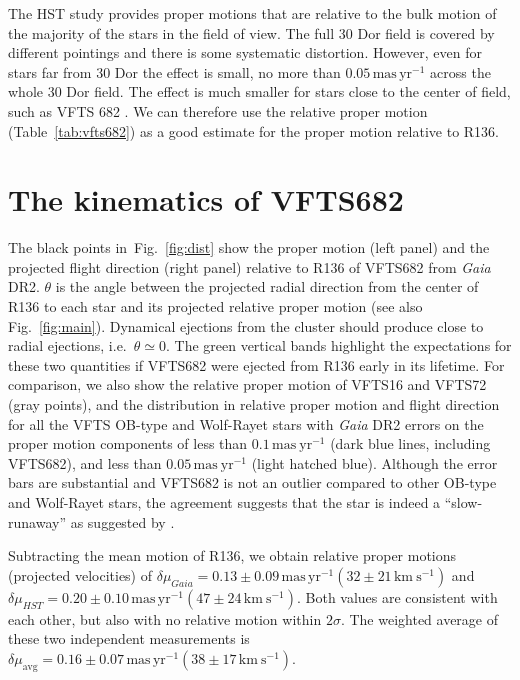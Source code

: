 \documentclass[a4paper,fleqn,usenatbib]{mnras}
\newcommand{\kms}{{\,\mathrm{km\ s^{-1}}}}
\newcommand{\masyr}{\,\mathrm{mas}\,\mathrm{yr}^{-1}}
\DeclareRobustCommand{\Figref}[1]{Fig.~\ref{#1}}
\DeclareRobustCommand{\Tabref}[1]{Table~\ref{#1}}
\begin{document}
The HST study provides proper motions that are relative to the bulk motion
of the majority of the stars in the field of view. The full 30 Dor
field is covered by different pointings and there is some systematic
distortion.  However, even for stars far from 30 Dor the effect is
small, no more than $0.05\masyr$ across the whole 30 Dor field. The
effect is much smaller for stars close to the center of field, such as
VFTS 682 \citep{platais:18}.  We can therefore use the relative proper
motion (\Tabref{tab:vfts682}) as a good estimate for the proper motion relative to R136. 
 

\section{The kinematics of VFTS682}
\label{sec:results}

The black points in~\Figref{fig:dist} show the proper motion 
(left panel) and the projected flight direction (right panel) relative
to R136 of
VFTS682 from \emph{Gaia} DR2. $\theta$ is the angle between the projected radial direction from the
center of R136 to each star and its projected relative proper motion
(see also \Figref{fig:main}). Dynamical ejections from the
cluster should %
produce close to radial ejections, i.e.~$\theta\simeq0$. The green
vertical bands highlight the expectations for these two quantities if VFTS682 were ejected from R136 early in its
lifetime. For comparison, we also show the relative
proper motion of VFTS16 and VFTS72 (gray points), and the distribution
in relative proper motion and flight direction for all the VFTS OB-type and Wolf-Rayet stars with
\emph{Gaia} DR2 errors on the proper motion
components of less than $0.1\,\mathrm{mas\ yr^{-1}}$ (dark blue lines,
including VFTS682), and less than $0.05\,\mathrm{mas\ yr^{-1}}$ (light hatched
blue). Although the error bars are substantial and VFTS682 is not
an outlier compared to other OB-type and Wolf-Rayet stars, the agreement
suggests that the star is indeed a ``slow-runaway'' as suggested by
\cite{bestenlehner:11}. 

Subtracting
the mean motion of R136, we obtain relative proper motions (projected
velocities) of $\delta \mu_{Gaia}=0.13\pm 0.09\masyr (32\pm 21\kms)$ and
$\delta \mu_{HST}=0.20\pm 0.10\masyr (47 \pm 24\kms )$. Both values
are consistent with each other, but also with no relative motion
within $2\sigma$. The weighted average of these two independent
measurements is $\delta \mu_\mathrm{avg}=0.16\pm0.07\masyr
(38\pm17\kms)$. 
\end{document}

